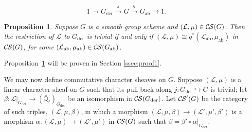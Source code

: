 \documentclass[10pt]{amsart}
\theoremstyle{plain}
\newtheorem{proposition}[theorem]{Proposition}
\theoremstyle{definition}
\newcommand{\EE}{\mathbb{\bar Q}_\ell}
\newcommand{\der}{_{\operatorname{der}}}
\newcommand{\ab}{_{\operatorname{ab}}}
\newcommand{\cs}[1]{{\mathcal{#1}}}
\newcommand{\CS}{{\mathcal{C\hskip-0.8pt S}}}
\begin{document}
\[
1 \to G\der \xrightarrow{j} G \xrightarrow{q} G\ab \to 1.
\]

\begin{proposition} \label{prop:Gder_triv}
Suppose $G$ is a smooth group scheme and $(\cs{L},\mu) \in \CS(G)$.
Then the restriction of $\cs{L}$ to $G\der$ is trivial if and only if $(\cs{L},\mu) \cong q^*(\cs{L}\ab,\mu\ab)$ in $\CS(G)$, for some $(\cs{L}\ab,\mu\ab) \in \CS(G\ab)$.
\end{proposition}

Proposition~\ref{prop:Gder_triv} will be proven in Section \ref{ssec:proof1}.

We may now define commutative character sheaves on $G$.
%
Suppose $(\cs{L},\mu)$ is a linear character sheaf on $G$ such that its pull-back along
$j: G\der \hookrightarrow G$ is trivial;
let $\beta : \cs{L}\vert_{G\der} \to (\EE)_{G\der}$ be an isomorphism in $\CS(G\der)$.
Let $\CS'(G)$ be the category of such triples, $(\cs{L},\mu,\beta)$, in which a morphism $(\cs{L},\mu,\beta)\to (\cs{L}',\mu',\beta')$ is a morphism $\alpha : (\cs{L},\mu)\to (\cs{L}',\mu')$ in $\CS(G)$ such that $\beta = \beta' \circ \alpha\vert_{G\der}$.
%
\end{document}
